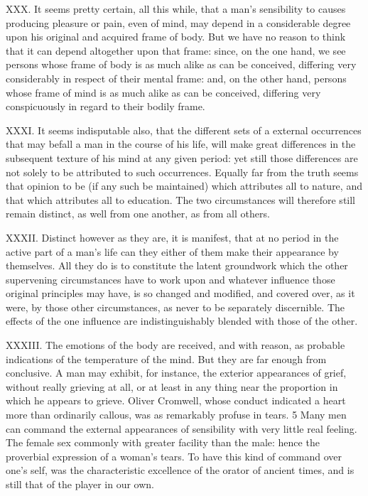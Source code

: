 \documentclass[12pt]{report}
\begin{document}
XXX. It seems pretty certain, all this while, that a man's sensibility
to causes producing pleasure or pain, even of mind, may depend in a
considerable degree upon his original and acquired frame of body. But we
have no reason to think that it can depend altogether upon that frame:
since, on the one hand, we see persons whose frame of body is as much
alike as can be conceived, differing very considerably in respect of
their mental frame: and, on the other hand, persons whose frame of mind
is as much alike as can be conceived, differing very conspicuously in
regard to their bodily frame.

XXXI. It seems indisputable also, that the different sets of a external
occurrences that may befall a man in the course of his life, will make
great differences in the subsequent texture of his mind at any given
period: yet still those differences are not solely to be attributed to
such occurrences. Equally far from the truth seems that opinion to be
(if any such be maintained) which attributes all to nature, and that
which attributes all to education. The two circumstances will therefore
still remain distinct, as well from one another, as from all others.

XXXII. Distinct however as they are, it is manifest, that at no period
in the active part of a man's life can they either of them make their
appearance by themselves. All they do is to constitute the latent
groundwork which the other supervening circumstances have to work upon
and whatever influence those original principles may have, is so changed
and modified, and covered over, as it were, by those other
circumstances, as never to be separately discernible. The effects of the
one influence are indistinguishably blended with those of the other.

XXXIII. The emotions of the body are received, and with reason, as
probable indications of the temperature of the mind. But they are far
enough from conclusive. A man may exhibit, for instance, the exterior
appearances of grief, without really grieving at all, or at least in any
thing near the proportion in which he appears to grieve. Oliver
Cromwell, whose conduct indicated a heart more than ordinarily callous,
was as remarkably profuse in tears. 5 Many men can command the external
appearances of sensibility with very little real feeling. The female sex
commonly with greater facility than the male: hence the proverbial
expression of a woman's tears. To have this kind of command over one's
self, was the characteristic excellence of the orator of ancient times,
and is still that of the player in our own.
\end{document}
